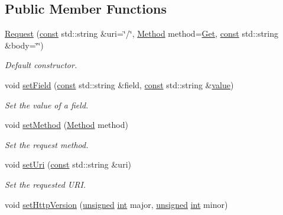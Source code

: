 \subsection*{Public Member Functions}
\begin{DoxyCompactItemize}
\item 
\hyperlink{classsf_1_1_http_1_1_request_a8e89d9e8ffcc1163259b35d79809a61c}{Request} (\hyperlink{term__entry_8h_a57bd63ce7f9a353488880e3de6692d5a}{const} std\-::string \&uri=\char`\"{}/\char`\"{}, \hyperlink{classsf_1_1_http_1_1_request_a620f8bff6f43e1378f321bf53fbf5598}{Method} method=\hyperlink{classsf_1_1_http_1_1_request_a620f8bff6f43e1378f321bf53fbf5598a24d06852a988a57bbc05874f675ea34b}{Get}, \hyperlink{term__entry_8h_a57bd63ce7f9a353488880e3de6692d5a}{const} std\-::string \&body=\char`\"{}\char`\"{})
\begin{DoxyCompactList}\small\item\em Default constructor. \end{DoxyCompactList}\item 
void \hyperlink{classsf_1_1_http_1_1_request_aea672fae5dd089f4b6b3745ed46210d2}{set\-Field} (\hyperlink{term__entry_8h_a57bd63ce7f9a353488880e3de6692d5a}{const} std\-::string \&field, \hyperlink{term__entry_8h_a57bd63ce7f9a353488880e3de6692d5a}{const} std\-::string \&\hyperlink{curses_8priv_8h_a3772851912abe3ccbff5c659ff71f2ff}{value})
\begin{DoxyCompactList}\small\item\em Set the value of a field. \end{DoxyCompactList}\item 
void \hyperlink{classsf_1_1_http_1_1_request_abab148554e873e80d2e41376fde1cb62}{set\-Method} (\hyperlink{classsf_1_1_http_1_1_request_a620f8bff6f43e1378f321bf53fbf5598}{Method} method)
\begin{DoxyCompactList}\small\item\em Set the request method. \end{DoxyCompactList}\item 
void \hyperlink{classsf_1_1_http_1_1_request_a3723de4b4f1a14b744477841c4ac22e6}{set\-Uri} (\hyperlink{term__entry_8h_a57bd63ce7f9a353488880e3de6692d5a}{const} std\-::string \&uri)
\begin{DoxyCompactList}\small\item\em Set the requested U\-R\-I. \end{DoxyCompactList}\item 
void \hyperlink{classsf_1_1_http_1_1_request_aa683b607b737a6224a91387b4108d3c7}{set\-Http\-Version} (\hyperlink{curses_8priv_8h_aca40206900cfc164654362fa8d4ad1e6}{unsigned} \hyperlink{term__entry_8h_ad65b480f8c8270356b45a9890f6499ae}{int} major, \hyperlink{curses_8priv_8h_aca40206900cfc164654362fa8d4ad1e6}{unsigned} \hyperlink{term__entry_8h_ad65b480f8c8270356b45a9890f6499ae}{int} minor)

\end{DoxyCompactItemize}
